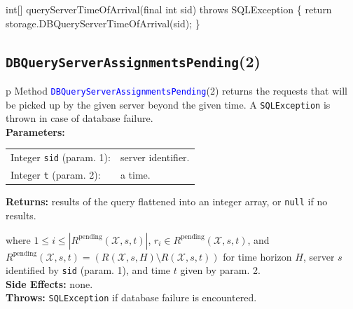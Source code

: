 \nwenddocs{}\endmoddef{}
int[] queryServerTimeOfArrival(final int sid) throws SQLException \{
  return storage.DBQueryServerTimeOfArrival(sid);
\}
\eatline
{}\nwendcode{}\nwdocspar
\subsection{\texttt{DBQueryServerAssignmentsPending}(2)}
\begin{tabular}{p{\textwidth}}
\toprule
{}
Method \textcolor{blue}{{\tt{}\protect{}DBQueryServerAssignmentsPending}}(2) returns the
requests that will be picked up by the given server beyond the given time.
A {\tt{}SQLException} is thrown in case of database failure.\\
\midrule
\textbf{Parameters:} \\
\begin{tabular}{lp{116mm}}
Integer {\tt{}sid} (param. 1):&server identifier.\\
Integer {\tt{}t} (param. 2):&a time.\\
\end{tabular}
\textbf{Returns:} results of the query flattened into an integer array,
or {\tt{}null} if no results.


where $1\leq i\leq |R^\textrm{pending}(\mathcal{X}, s, t)|$,
$r_i\in R^\textrm{pending}(\mathcal{X}, s, t)$, and
$R^\textrm{pending}(\mathcal{X}, s, t)= (R(\mathcal{X},s,H)\setminus R(\mathcal{X},s,t))$ for
time horizon $H$, server $s$ identified by {\tt{}sid} (param. 1), and time $t$ given by param. 2.\\
\textbf{Side Effects:} none.\\
\textbf{Throws:} {\tt{}SQLException} if database failure is encountered.\\
\bottomrule
\end{tabular}

